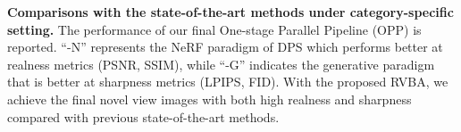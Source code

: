 \begin{table}[t]
    \caption{\textbf{ Comparisons with the state-of-the-art methods under category-specific setting.} The performance of our final One-stage Parallel Pipeline (OPP) is reported. ``-N'' represents the NeRF paradigm of DPS which performs better at realness metrics (PSNR, SSIM), while ``-G'' indicates the generative paradigm that is better at sharpness metrics (LPIPS, FID). With the proposed RVBA, we achieve the final novel view images with both high realness and sharpness compared with previous state-of-the-art methods. }
  \label{tab:category_specific}
\end{table}